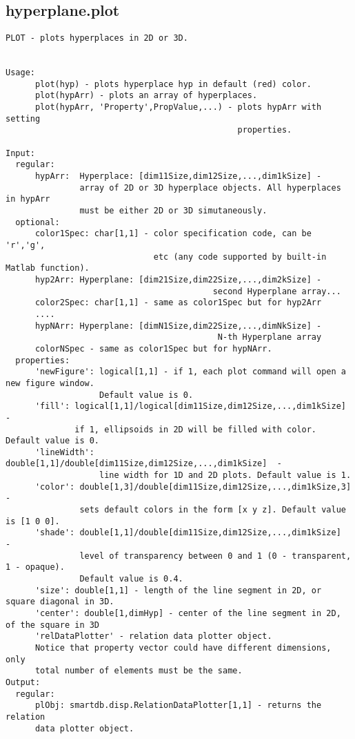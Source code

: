 \subsection{\texorpdfstring{hyperplane.plot}{plot}}\label{method:hyperplane.plot}
\begin{verbatim}
PLOT - plots hyperplaces in 2D or 3D.


Usage:
      plot(hyp) - plots hyperplace hyp in default (red) color.
      plot(hypArr) - plots an array of hyperplaces.
      plot(hypArr, 'Property',PropValue,...) - plots hypArr with setting
                                               properties.

Input:
  regular:
      hypArr:  Hyperplace: [dim11Size,dim12Size,...,dim1kSize] -
               array of 2D or 3D hyperplace objects. All hyperplaces in hypArr
               must be either 2D or 3D simutaneously.
  optional:
      color1Spec: char[1,1] - color specification code, can be 'r','g',
                              etc (any code supported by built-in Matlab function).
      hyp2Arr: Hyperplane: [dim21Size,dim22Size,...,dim2kSize] -
                                          second Hyperplane array...
      color2Spec: char[1,1] - same as color1Spec but for hyp2Arr
      ....
      hypNArr: Hyperplane: [dimN1Size,dim22Size,...,dimNkSize] -
                                           N-th Hyperplane array
      colorNSpec - same as color1Spec but for hypNArr.
  properties:
      'newFigure': logical[1,1] - if 1, each plot command will open a new figure window.
                   Default value is 0.
      'fill': logical[1,1]/logical[dim11Size,dim12Size,...,dim1kSize]  -
              if 1, ellipsoids in 2D will be filled with color. Default value is 0.
      'lineWidth': double[1,1]/double[dim11Size,dim12Size,...,dim1kSize]  -
                   line width for 1D and 2D plots. Default value is 1.
      'color': double[1,3]/double[dim11Size,dim12Size,...,dim1kSize,3] -
               sets default colors in the form [x y z]. Default value is [1 0 0].
      'shade': double[1,1]/double[dim11Size,dim12Size,...,dim1kSize]  -
               level of transparency between 0 and 1 (0 - transparent, 1 - opaque).
               Default value is 0.4.
      'size': double[1,1] - length of the line segment in 2D, or square diagonal in 3D.
      'center': double[1,dimHyp] - center of the line segment in 2D, of the square in 3D
      'relDataPlotter' - relation data plotter object.
      Notice that property vector could have different dimensions, only
      total number of elements must be the same.
Output:
  regular:
      plObj: smartdb.disp.RelationDataPlotter[1,1] - returns the relation
      data plotter object.
\end{verbatim}
